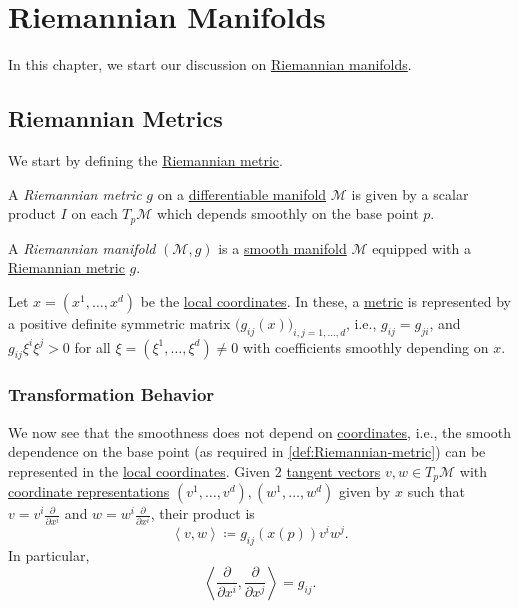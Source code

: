 \chapter{Riemannian Manifolds}
In this chapter, we start our discussion on \hyperref[def:Riemannian-manifold]{Riemannian manifolds}.

\section{Riemannian Metrics}
We start by defining the \hyperref[def:Riemannian-metric]{Riemannian metric}.

\begin{definition}\label{def:Riemannian-metric}
	A \emph{Riemannian metric} \(g\) on a \hyperref[def:smooth-manifold]{differentiable manifold} \(\mathcal{M} \) is given by a scalar product \(I\) on each \(T_p \mathcal{M} \) which depends smoothly on the base point \(p\).
\end{definition}

\begin{definition}\label{def:Riemannian-manifold}
	A \emph{Riemannian manifold} \((\mathcal{M} , g)\) is a \hyperref[def:smooth-manifold]{smooth manifold} \(\mathcal{M} \) equipped with a \hyperref[def:Riemannian-metric]{Riemannian metric} \(g\).
\end{definition}

Let \(x=(x^1, \ldots , x^d)\) be the \hyperref[def:coordinate-chart]{local coordinates}. In these, a \hyperref[def:Riemannian-metric]{metric} is represented by a positive definite symmetric matrix \(\big( g_{ij} (x) \big) _{i, j=1, \ldots , d}\), i.e., \(g_{ij} = g_{ji} \), and \(g_{ij} \xi ^i \xi ^j > 0\) for all \(\xi =(\xi ^1, \ldots , \xi ^d) \neq 0\) with coefficients smoothly depending on \(x\).

\subsection{Transformation Behavior}
We now see that the smoothness does not depend on \hyperref[def:coordinate-chart]{coordinates}, i.e., the smooth dependence on the base point (as required in \autoref{def:Riemannian-metric}) can be represented in the \hyperref[def:coordinate-chart]{local coordinates}. Given \(2\) \hyperref[def:tangent-vector]{tangent vectors} \(v, w\in T_p \mathcal{M} \) with \hyperref[def:coordinate-chart]{coordinate representations} \((v^1, \ldots , v^d), (w^1, \ldots , w^d)\) given by \(x\) such that \(v = v^i \frac{\partial }{\partial x^i} \) and \(w = w^i \frac{\partial }{\partial x^i} \), their product is
\[
	\left\langle v, w \right\rangle \coloneqq g_{ij} (x(p)) v^i w^j.
\]
In particular,
\[
	\left\langle \frac{\partial }{\partial x^i} , \frac{\partial }{\partial x^j} \right\rangle = g_{ij} .
\]

